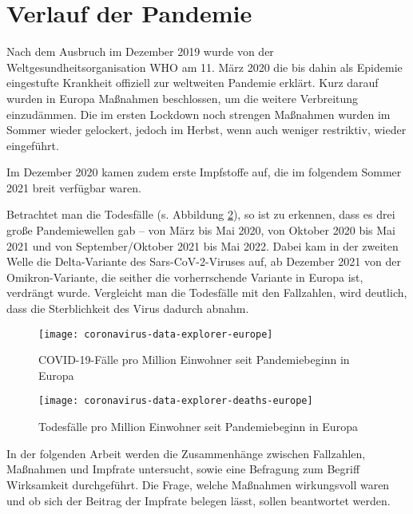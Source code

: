\section{Verlauf der Pandemie}
\label{sec:pandemieverlauf}

Nach dem Ausbruch im Dezember 2019 wurde von der Weltgesundheitsorganisation WHO am 11. März 2020 die bis dahin als Epidemie eingestufte Krankheit offiziell zur weltweiten Pandemie erklärt. Kurz darauf wurden in Europa Maßnahmen beschlossen, um die weitere Verbreitung einzudämmen. Die im ersten Lockdown noch strengen Maßnahmen wurden im Sommer wieder gelockert, jedoch im Herbst, wenn auch weniger restriktiv, wieder eingeführt.

Im Dezember 2020 kamen zudem erste Impfstoffe auf, die im folgendem Sommer 2021 breit verfügbar waren.

Betrachtet man die Todesfälle (s. Abbildung \ref{fig:deaths}), so ist zu erkennen, dass es drei große Pandemiewellen gab -- von März bis Mai 2020, von Oktober 2020 bis Mai 2021 und von September/Oktober 2021 bis Mai 2022. Dabei kam in der zweiten Welle die Delta-Variante des Sars-CoV-2-Viruses auf, ab Dezember 2021 von der Omikron-Variante, die seither die vorherrschende Variante in Europa ist, verdrängt wurde. Vergleicht man die Todesfälle mit den Fallzahlen, wird deutlich, dass die Sterblichkeit des Virus dadurch abnahm.

\begin{figure}[ht]
    \caption{COVID-19-Fälle pro Million Einwohner seit Pandemiebeginn in Europa \cite{owidcoronavirus}}
    \label{fig:cases}
    \centering
    \texttt{[image: coronavirus-data-explorer-europe]}
\end{figure}

\begin{figure}[ht]
    \caption{Todesfälle pro Million Einwohner seit Pandemiebeginn in Europa \cite{owidcoronavirus}}
    \label{fig:deaths}
    \centering
    \texttt{[image: coronavirus-data-explorer-deaths-europe]}
\end{figure}

In der folgenden Arbeit werden die Zusammenhänge zwischen Fallzahlen, Maßnahmen und Impfrate untersucht, sowie eine Befragung zum Begriff Wirksamkeit durchgeführt. Die Frage, welche Maßnahmen wirkungsvoll waren und ob sich der Beitrag der Impfrate belegen lässt, sollen beantwortet werden.
